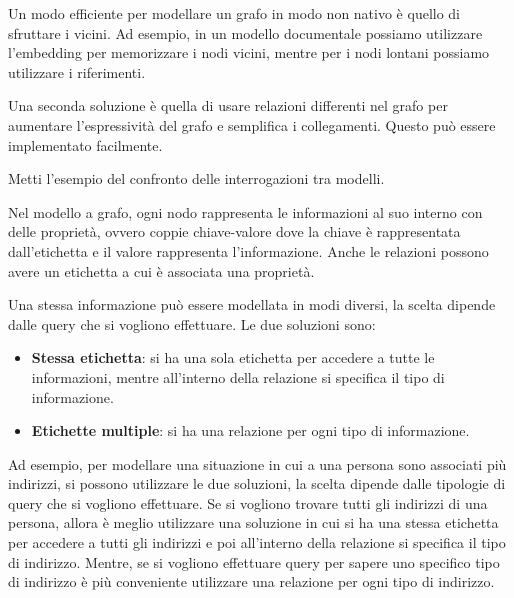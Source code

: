       Un modo efficiente per modellare un grafo in modo non nativo è quello di sfruttare
      i vicini. Ad esempio, in un modello documentale possiamo utilizzare l'embedding
      per memorizzare i nodi vicini, mentre per i nodi lontani possiamo utilizzare i
      riferimenti.

      Una seconda soluzione è quella di usare relazioni differenti nel grafo per aumentare
      l'espressività del grafo e semplifica i collegamenti. Questo può essere implementato
      facilmente.

      \begin{esempio}
            Metti l'esempio del confronto delle interrogazioni tra modelli.
      \end{esempio}

      Nel modello a grafo, ogni nodo rappresenta le informazioni al suo interno con
      delle proprietà, ovvero coppie chiave-valore dove la chiave è rappresentata
      dall'etichetta e il valore rappresenta l'informazione. Anche le relazioni possono
      avere un etichetta a cui è associata una proprietà.

      Una stessa informazione può essere modellata in modi diversi, la scelta dipende
      dalle query che si vogliono effettuare. Le due soluzioni sono:
      \begin{itemize}
            \item \textbf{Stessa etichetta}: si ha una sola etichetta per accedere
                  a tutte le informazioni, mentre all'interno della relazione si specifica
                  il tipo di informazione.
            \item \textbf{Etichette multiple}: si ha una relazione per ogni tipo di
                  informazione.
      \end{itemize}
      Ad esempio, per modellare una situazione in cui a una persona sono associati più
      indirizzi, si possono utilizzare le due soluzioni, la scelta dipende dalle
      tipologie di query che si vogliono effettuare. Se si vogliono trovare tutti
      gli indirizzi di una persona, allora è meglio utilizzare una soluzione in cui
      si ha una stessa etichetta per accedere a tutti gli indirizzi e poi all'interno
      della relazione si specifica il tipo di indirizzo. Mentre, se si vogliono
      effettuare query per sapere uno specifico tipo di indirizzo è più conveniente
      utilizzare una relazione per ogni tipo di indirizzo.
